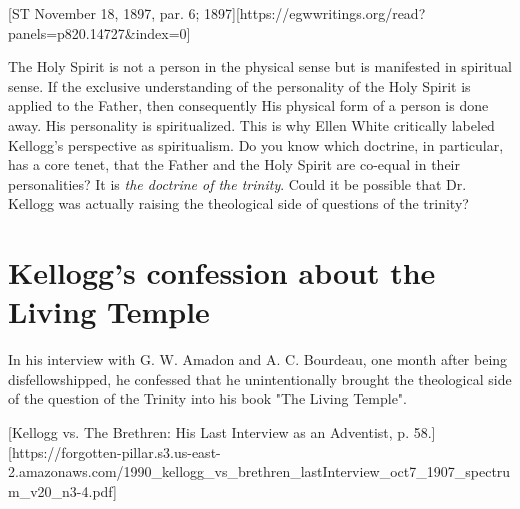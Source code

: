 [ST November 18, 1897, par. 6; 1897][https://egwwritings.org/read?panels=p820.14727&index=0]

The Holy Spirit is not a person in the physical sense but is manifested in spiritual sense. If the exclusive understanding of the personality of the Holy Spirit is applied to the Father, then consequently His physical form of a person is done away. His personality is spiritualized. This is why Ellen White critically labeled Kellogg's perspective as spiritualism. Do you know which doctrine, in particular, has a core tenet, that the Father and the Holy Spirit are co-equal in their personalities? It is \textit{the doctrine of the trinity}. Could it be possible that Dr. Kellogg was actually raising the theological side of questions of the trinity?

\section*{Kellogg’s confession about the Living Temple}

In his interview with G. W. Amadon and A. C. Bourdeau, one month after being disfellowshipped, he confessed that he unintentionally brought the theological side of the question of the Trinity into his book "The Living Temple".

[Kellogg vs. The Brethren: His Last Interview as an Adventist, p. 58.][https://forgotten-pillar.s3.us-east-2.amazonaws.com/1990\_kellogg\_vs\_brethren\_lastInterview\_oct7\_1907\_spectrum\_v20\_n3-4.pdf]

